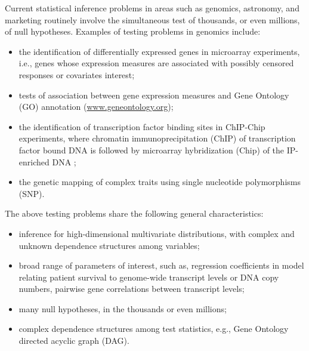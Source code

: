 \documentclass[11pt]{article}
\begin{document}
Current statistical inference problems in areas such as genomics, astronomy, and marketing routinely involve the simultaneous test of thousands, or even millions, of null hypotheses. 
Examples of testing problems in genomics include: 
\begin{itemize}
\item
the identification of differentially expressed genes in microarray experiments, i.e., genes whose expression measures are associated with possibly censored responses or covariates interest; 
\item
tests of association between gene expression measures and Gene Ontology (GO) annotation (\url{www.geneontology.org});
\item
the identification of transcription factor binding sites in ChIP-Chip experiments, where chromatin immunoprecipitation (ChIP) of transcription factor bound DNA is followed by microarray hybridization (Chip) of the IP-enriched DNA \cite{KelesetalTechRep147}; 
\item
the genetic mapping of complex traits using single nucleotide polymorphisms (SNP). 
\end{itemize}
The above testing problems share the following general characteristics: 
\begin{itemize}
\item
inference for  high-dimensional multivariate distributions, with complex and unknown dependence structures among variables;
\item
broad range of parameters of interest, such as, regression coefficients in model relating patient survival to genome-wide transcript levels or DNA copy numbers, pairwise gene correlations between transcript levels; 
\item
many null hypotheses, in the thousands or even millions; 
\item
complex dependence structures among test statistics, e.g., Gene Ontology directed acyclic graph (DAG).
\end{itemize}
\end{document}
